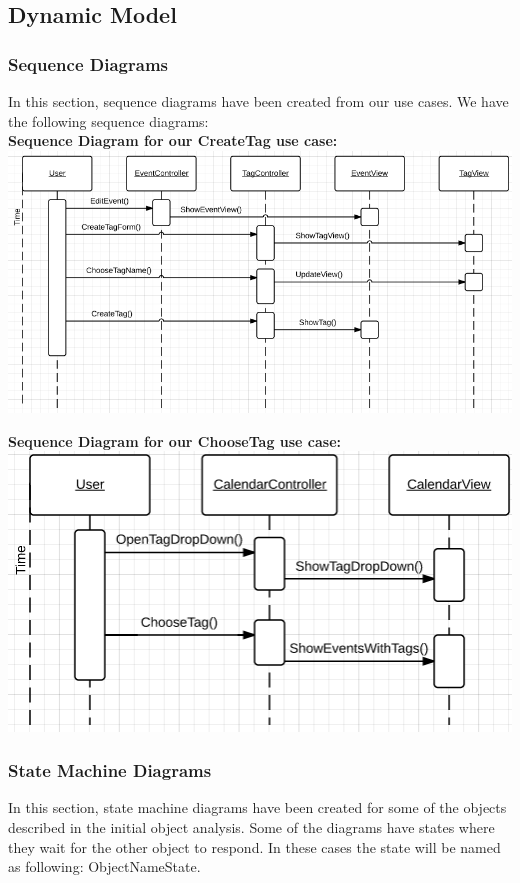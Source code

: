 \subsection{Dynamic Model}

\subsubsection{Sequence Diagrams}
In this section, sequence diagrams have been created from our use cases. We have the following sequence diagrams:\\

\textbf{Sequence Diagram for our CreateTag use case:}
\includegraphics[scale=0.5]{SequenceDiagramUseCaseOne}

\textbf{Sequence Diagram for our ChooseTag use case:}
\includegraphics[scale=0.5]{SequenceDiagramUseCaseTwo}

\subsubsection{State Machine Diagrams}
In this section, state machine diagrams have been created for some of the objects described in the initial object analysis. Some of the diagrams have states where they wait for the other object to respond. In these cases the state will be named as following: ObjectNameState.\\

